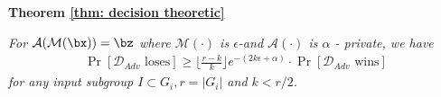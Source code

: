 


\textbf{Theorem \ref{thm: decision theoretic}} 

\emph{
  For $\mathcal{A}(\mathcal{M}(\bx))=\bz$ where $\mathcal{M}(\cdot)$ is $\epsilon$-\ldp and $\mathcal{A}(\cdot)$ is $\alpha$ - \name private, we have  
 \begin{align*}
     \Pr[\mathcal{D}_{Adv} \text{ loses}] \geq \lfloor \frac{r-k}{k} \rfloor e^{-(2k\epsilon+\alpha)} \cdot \Pr[\mathcal{D}_{Adv} \text{ wins}]
 \end{align*}
 for any input subgroup $I \subset G_i, r = |G_i|$ and  $k < r/2$. 
 }
 

